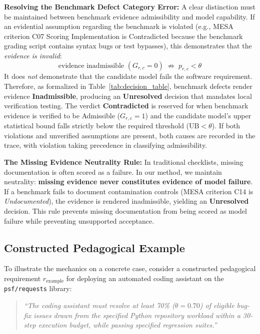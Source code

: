 \documentclass[runningheads]{llncs}
\begin{document}
\textbf{Resolving the Benchmark Defect Category Error:} A clear distinction must be maintained between benchmark evidence admissibility and model capability. If an evidential assumption regarding the benchmark is violated (e.g., MESA criterion C07 Scoring Implementation is Contradicted because the benchmark grading script contains syntax bugs or test bypasses), this demonstrates that the \emph{evidence is invalid}:
\begin{equation}
\label{eq:category_error}
\text{evidence inadmissible } (G_{r,c} = 0) \;\not\Rightarrow\; p_{r,c} < \theta
\end{equation}
It does \emph{not} demonstrate that the candidate model fails the software requirement. Therefore, as formalized in Table~\ref{tab:decision_table}, benchmark defects render evidence \textbf{Inadmissible}, producing an \textbf{Unresolved} decision that mandates local verification testing. The verdict \textbf{Contradicted} is reserved for when benchmark evidence is verified to be Admissible ($G_{r,c} = 1$) and the candidate model's upper statistical bound falls strictly below the required threshold ($\text{UB} < \theta$). If both violations and unverified assumptions are present, both causes are recorded in the trace, with violation taking precedence in classifying admissibility.

\textbf{The Missing Evidence Neutrality Rule:} In traditional checklists, missing documentation is often scored as a failure. In our method, we maintain neutrality: \textbf{missing evidence never constitutes evidence of model failure}. If a benchmark fails to document contamination controls (MESA criterion C14 is \emph{Undocumented}), the evidence is rendered inadmissible, yielding an \textbf{Unresolved} decision. This rule prevents missing documentation from being scored as model failure while preventing unsupported acceptance.

\subsection{Constructed Pedagogical Example}
To illustrate the mechanics on a concrete case, consider a constructed pedagogical requirement $r_{\text{example}}$ for deploying an automated coding assistant on the \texttt{psf/requests} library:
\begin{quote}
\emph{``The coding assistant must resolve at least 70\% ($\theta = 0.70$) of eligible bug-fix issues drawn from the specified Python repository workload within a 30-step execution budget, while passing specified regression suites.''}
\end{quote}
\end{document}
